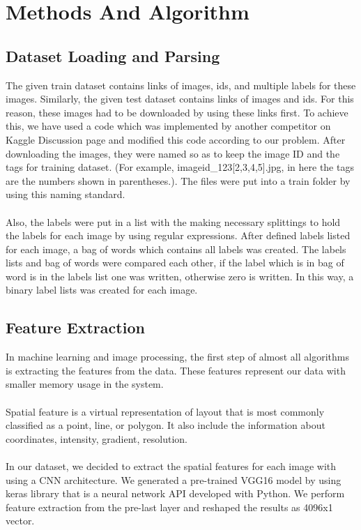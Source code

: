 \documentclass[12pt]{article}
\begin{document}
\section{Methods And Algorithm}

\subsection{Dataset Loading and Parsing}
The given train dataset contains links of images, ids, and multiple labels for these images. Similarly, the given test dataset contains links of images and ids. For this reason, these images had to be downloaded by using these links first. To achieve this, we have used a code which was implemented by another competitor on Kaggle Discussion page and modified this code according to our problem.  After downloading the images,  they were named so as to keep the image ID and the tags for training dataset. (For example, imageid\_123[2,3,4,5].jpg, in here the tags are the numbers shown in parentheses.). The files were put into a train folder by using this naming standard.\\
 \\Also, the labels were put in a list with the making necessary splittings to hold the labels for each image by using regular expressions. After defined labels listed for each image, a bag of words which contains all labels was created. The labels lists and bag of words were compared each other, if the label which is in bag of word is in the labels list one was written, otherwise zero is written. In this way, a binary label lists was created for each image.


\subsection{Feature Extraction}
In machine learning and image processing, the first step of almost all algorithms is extracting the features from the data. These features represent our data with smaller memory usage in the system.\\
\\Spatial feature is a virtual representation of layout that is most commonly classified as a point, line, or polygon. It also  include the information about coordinates, intensity, gradient, resolution.\\
\\In our dataset, we decided to extract the spatial features for each image with using a CNN architecture. We generated a pre-trained VGG16 model by using keras library that is a neural network API developed with Python. We perform feature extraction from the pre-last layer and reshaped the results as 4096x1 vector.\\
\end{document}
